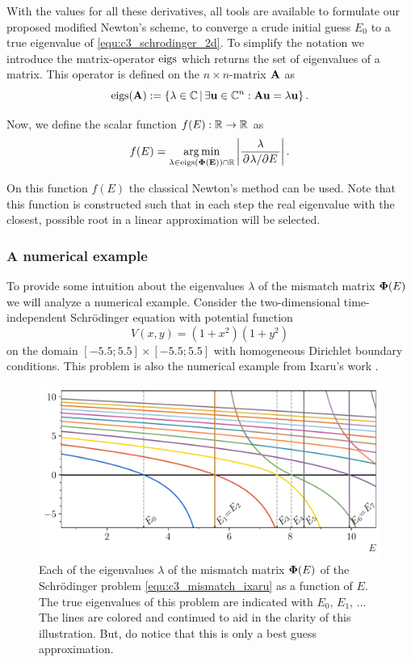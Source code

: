 With the values for all these derivatives, all tools are available to formulate our proposed modified Newton's scheme, to converge a crude initial guess $E_0$ to a true eigenvalue of \eqref{equ:c3_schrodinger_2d}. To simplify the notation we introduce the matrix-operator $\operatorname{eigs}$ which returns the set of eigenvalues of a matrix. This operator is defined on the $n \times n$-matrix $\vb{A}$ as
$$
    \operatorname{eigs}(\vb{A}) := \left\{\lambda \in \mathbb{C} \, | \, \exists \vb{u} \in \mathbb{C}^n : \vb{A} \vb{u} = \lambda \vb{u} \right\}\text{.}
$$

Now, we define the scalar function $f(E) : \mathbb{R} \to \mathbb{R}$ as 
\begin{equation}\label{equ:c3_mismatch_newton_function}
    f(E) = \operatorname*{arg\,min}_{\lambda \in \operatorname{eigs}(\vb{\Phi(E)}) \cap \mathbb{R}} \left|\frac{\lambda}{\pdv*[]{\lambda}{E}}\right|\text{.}
\end{equation}

On this function $f(E)$ the classical Newton's method can be used. Note that this function is constructed such that in each step the real eigenvalue with the closest, possible root in a linear approximation will be selected.

\subsubsection{A numerical example}

To provide some intuition about the eigenvalues $\lambda$ of the mismatch matrix $\vb{\Phi}(E)$ we will analyze a numerical example. Consider the two-dimensional time-independent Schrödinger equation with potential function
\begin{equation}\label{equ:c3_mismatch_ixaru}
    V(x, y) = (1+x^2)(1+y^2)
\end{equation}
on the domain $[-5.5; 5.5] \times [-5.5; 5.5]$ with homogeneous Dirichlet boundary conditions. This problem is also the numerical example from Ixaru's work \cite{ixaru_new_2010}.

\begin{figure}
    \centering
    \includegraphics[width=\textwidth]{img/chapter3/mismatch_rainbow.pdf}
    \caption{Each of the eigenvalues $\lambda$ of the mismatch matrix $\vb{\Phi}(E)$ of the Schrödinger problem \eqref{equ:c3_mismatch_ixaru} as a function of $E$. The true eigenvalues of this problem are indicated with $E_0$, $E_1$, $\dots$ The lines are colored and continued to aid in the clarity of this illustration. But, do notice that this is only a best guess approximation.}\label{fig:c3_mismatch_rainbow}
\end{figure}

